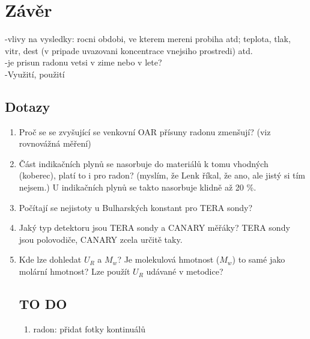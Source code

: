 \chapter{Závěr}
-vlivy na vysledky: rocni obdobi, ve kterem mereni probiha atd; teplota, tlak, vitr, dest (v pripade uvazovani koncentrace vnejsiho prostredi) atd.\\
-je prisun radonu vetsi v zime nebo v lete?\\
-Využití, použití
\section{Dotazy}
\begin{enumerate}
	\item Proč se se zvyšující se venkovní OAR přísuny radonu zmenšují? (viz rovnovážná měření)
	\item Část indikačních plynů se nasorbuje do materiálů k tomu vhodných (koberec), platí to i pro radon? (myslím, že Lenk říkal, že ano, ale jistý si tím nejsem.) U indikačních plynů se takto nasorbuje klidně až 20 \%.
	\item Počítají se nejistoty u Bulharských konstant pro TERA sondy?
    \item Jaký typ detektoru jsou TERA sondy a CANARY měřáky? TERA sondy jsou polovodiče, CANARY zcela určitě taky.
    \item Kde lze dohledat $U_R$ a $M_w$? Je molekulová hmotnost ($M_w$) to samé jako molární hmotnost? Lze použít $U_R$ udávané v metodice?
\section{TO DO}
\begin{enumerate}
    \item radon: přidat fotky kontinuálů
\end{enumerate}
\end{enumerate}
